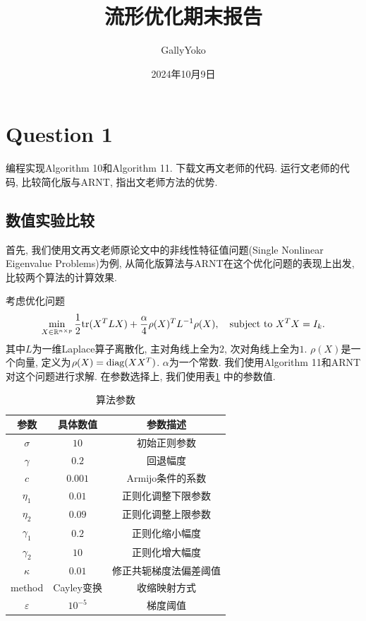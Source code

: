 \documentclass[UTF8]{ctexart}
\begin{document}
\title{流形优化期末报告}
\author{GallyYoko}
\date{2024年10月9日}
\maketitle

\section{Question 1}

编程实现Algorithm 10和Algorithm 11. 下载文再文老师的代码. 运行文老师的代码, 比较简化版与ARNT, 指出文老师方法的优势. 

\subsection{数值实验比较}

首先, 我们使用文再文老师原论文中的非线性特征值问题(Single Nonlinear Eigenvalue Problems)为例, 从简化版算法与ARNT在这个优化问题的表现上出发, 比较两个算法的计算效果. 

考虑优化问题
\[\min_{X\in\mathbb{R}^{n\times p}} \frac{1}{2} \textup{tr}(X^T LX)+\frac{\alpha}{4}\rho(X)^T L^{-1}\rho(X),\quad\textup{subject to }X^T X=I_k.\]
其中$L$为一维Laplace算子离散化, 主对角线上全为$2$, 次对角线上全为$1$. $\rho(X)$是一个向量, 定义为$\rho(X)=\textup{diag}(XX^T)$. $\alpha$为一个常数. 我们使用Algorithm 11和ARNT对这个问题进行求解. 在参数选择上, 我们使用表\ref{tab2} 中的参数值. 

\begin{table}[htb]
    \centering
    \begin{tabular}{c|cc}
        \hline
        \hline
        参数 & 具体数值 & 参数描述\\
        \hline
        $\sigma$ & $10$ & 初始正则参数\\
        $\gamma$ & $0.2$ & 回退幅度\\
        $c$ & $0.001$ & Armijo条件的系数\\
        $\eta_1$ & $0.01$ & 正则化调整下限参数\\
        $\eta_2$ & $0.09$ & 正则化调整上限参数\\
        $\gamma_1$ & $0.2$ & 正则化缩小幅度\\
        $\gamma_2$ & $10$ & 正则化增大幅度\\
        $\kappa$ & $0.01$ & 修正共轭梯度法偏差阈值\\
        method & Cayley变换 & 收缩映射方式\\
        $\varepsilon$ & $10^{-5}$ & 梯度阈值\\
        \hline
        \hline
    \end{tabular}
    \caption{算法参数}\label{tab2}
\end{table}
\end{document}
